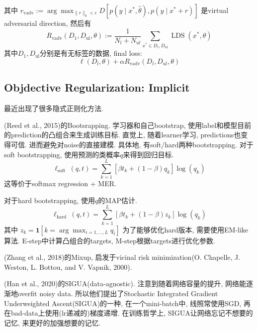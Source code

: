 \documentclass{article}
\begin{document}
其中
$r_{\mathrm{vadv}}:=\arg \max _{\|r\|_{0}<\epsilon} D\left[p\left(y \mid x^{*}, \hat{\theta}\right), p\left(y \mid x^{*}+r\right)\right]$
是virtual adversarial direction, 然后有
\begin{equation}
    R_{\mathrm{vadv}}\left(D_{1}, D_{\mathrm{ul}}, \theta\right):=\frac 1 {N_{l}+N_{u l}} \sum_{x^{*} \in D_{l}, D_{u l}} \operatorname{LDS}\left(x^{*}, \theta\right)
\end{equation}
其中$D_{1}, D_{\mathrm{ul}}$分别是有无标签的数据, final loss:
\begin{equation}
    \ell\left(D_{l}, \theta\right)+\alpha R_{\mathrm{vadv}}\left(D_{l}, D_{u l}, \theta\right)
\end{equation}

\subsection{Objdective Regularization: Implicit}

最近出现了很多隐式正则化方法. 

(Reed et al., 2015)的Bootsrapping. 学习器和自己bootstrap, 使用label和模型目前的prediction的凸组合来生成训练目标. 直觉上, 随着learner学习, predictions也变得可信. 进而避免对noise的直接建模. 具体地, 有soft/hard两种bootstrapping. 对于soft bootstrapping, 使用预测的类概率$q$来得到回归目标.
\begin{equation}
    \ell_{\text {soft }}(q, t)=\sum_{k=1}^{L}\left[\beta t_{k}+(1-\beta) q_{k}\right] \log \left(q_{k}\right)
\end{equation}
这等价于softmax regression + MER.

对于hard bootstrapping, 使用$q$的MAP估计.
\begin{equation}
    \ell_{\text {hard }}(q, t)=\sum_{k=1}^{L}\left[\beta t_{k}+(1-\beta) z_{k}\right] \log \left(q_{k}\right)
\end{equation}
其中
$z_{k}=\mathbf{1}\left[k=\arg \max _{i=1, \ldots, L} q_{i}\right]$
为了能够优化hard版本, 需要使用EM-like算法. E-step中计算凸组合的targets, M-step根据targets进行优化参数.

(Zhang et al., 2018)的Mixup, 启发于vicinal risk minimization(O. Chapelle, J. Weston, L. Bottou, and V. Vapnik, 2000).

(Han et al., 2020)的SIGUA(data-agnostic). 注意到随着网络容量的提升, 网络能逐渐地overfit noisy data. 所以他们提出了Stochastic Integrated Gradient Underweighted Ascent(SIGUA)的一种, 在一个mini-batch中, 线照常使用SGD, 再在bad-data上使用(lr递减的)梯度递增. 在训练哲学上, SIGUA让网络忘记不想要的记忆, 来更好的加强想要的记忆.
\end{document}
